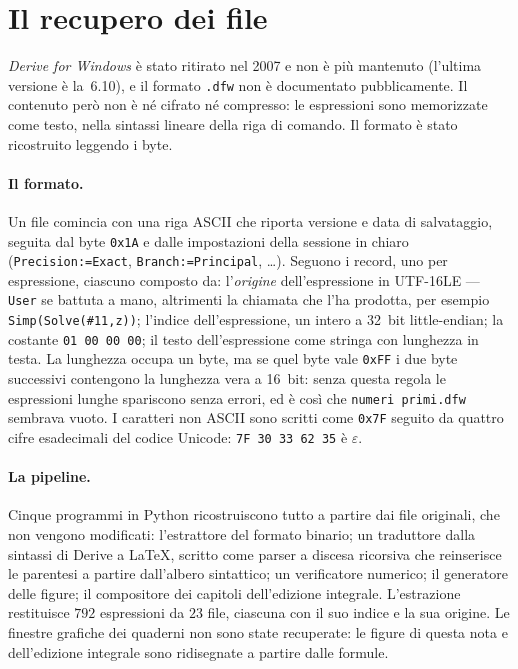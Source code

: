 \section{Il recupero dei file}
\label{app:recupero}

\emph{Derive for Windows} \`e stato ritirato nel 2007 e non \`e pi\`u
mantenuto (l'ultima versione \`e la~6.10), e il formato \texttt{.dfw} non \`e
documentato pubblicamente. Il contenuto per\`o non \`e
n\'e cifrato n\'e compresso: le espressioni sono memorizzate come testo,
nella sintassi lineare della riga di comando. Il formato \`e stato
ricostruito leggendo i byte.

\paragraph{Il formato.}
Un file comincia con una riga ASCII che riporta versione e data di
salvataggio, seguita dal byte \texttt{0x1A} e dalle impostazioni della
sessione in chiaro (\texttt{Precision:=Exact}, \texttt{Branch:=Principal},
\dots). Seguono i record, uno per espressione, ciascuno composto da:
l'\emph{origine} dell'espressione in UTF-16LE --- \texttt{User} se battuta
a mano, altrimenti la chiamata che l'ha prodotta, per esempio
\texttt{Simp(Solve(\#11,z))}; l'indice dell'espressione, un intero a
32~bit little-endian; la costante \texttt{01 00 00 00}; il testo
dell'espressione come stringa con lunghezza in testa. La lunghezza occupa
un byte, ma se quel byte vale \texttt{0xFF} i due byte successivi contengono
la lunghezza vera a 16~bit: senza questa regola le espressioni lunghe
spariscono senza errori, ed \`e cos\`i che \texttt{numeri primi.dfw} sembrava
vuoto. I caratteri non ASCII sono scritti come \texttt{0x7F} seguito da
quattro cifre esadecimali del codice Unicode: \texttt{7F 30 33 62 35} \`e
$\varepsilon$.

\paragraph{La pipeline.}
Cinque programmi in Python ricostruiscono tutto a partire dai file originali,
che non vengono modificati: l'estrattore del formato binario; un traduttore
dalla sintassi di Derive a \LaTeX, scritto come parser a discesa ricorsiva che
reinserisce le parentesi a partire dall'albero sintattico; un verificatore
numerico; il generatore delle figure; il compositore dei capitoli
dell'edizione integrale. L'estrazione restituisce
$792$ espressioni da $23$ file, ciascuna con il suo indice e la sua origine.
Le finestre grafiche dei quaderni non sono state recuperate: le figure di
questa nota e dell'edizione integrale sono ridisegnate a partire dalle
formule.

